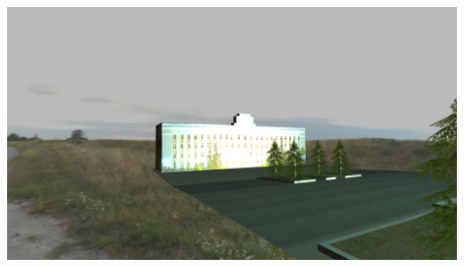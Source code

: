 \documentclass[a4paper,12pt]{article}
\begin{document}
\begin{flushleft}
  \includegraphics[scale=0.2]{screen_5.png}
\end{flushleft}
\end{document}
